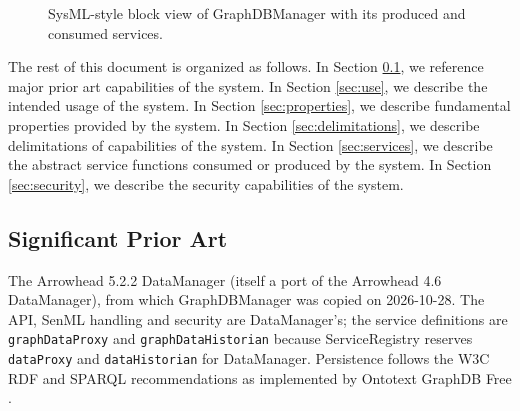 \documentclass[a4paper]{arrowhead}
\begin{document}
\begin{figure}[ht!]
  \centering
  \caption{SysML-style block view of GraphDBManager with its produced and consumed services.}
  \label{fig:system}
\end{figure}

The rest of this document is organized as follows.
In Section \ref{sec:prior_art}, we reference major prior art capabilities of the system.
In Section \ref{sec:use}, we describe the intended usage of the system.
In Section \ref{sec:properties}, we describe fundamental properties provided by the system.
In Section \ref{sec:delimitations}, we describe delimitations of capabilities of the system.
In Section \ref{sec:services}, we describe the abstract service functions consumed or produced by the system.
In Section \ref{sec:security}, we describe the security capabilities of the system.

\newpage

\subsection{Significant Prior Art}
\label{sec:prior_art}

The Arrowhead 5.2.2 DataManager \cite{dm-sysd-ref} (itself a port of the Arrowhead 4.6 DataManager), from which GraphDBManager was copied on 2026-10-28. The API, SenML handling and security are DataManager's; the service definitions are \texttt{graphDataProxy} and \texttt{graphDataHistorian} because ServiceRegistry reserves \texttt{dataProxy} and \texttt{dataHistorian} for DataManager. Persistence follows the W3C RDF and SPARQL recommendations \cite{rdf11,sparql11} as implemented by Ontotext GraphDB Free \cite{graphdb}.
\end{document}
